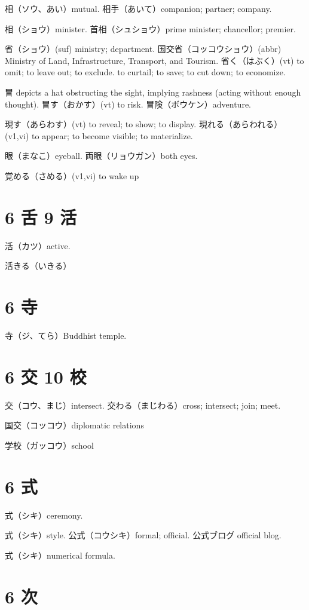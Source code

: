 相（ソウ、あい）mutual.
相手（あいて）companion; partner; company.

相（ショウ）minister.
首相（シュショウ）prime minister; chancellor; premier.

省（ショウ）(suf) ministry; department.
国交省（コッコウショウ）(abbr)
Ministry of Land, Infrastructure, Transport, and Tourism.
省く（はぶく）(vt)
to omit; to leave out; to exclude.
to curtail; to save; to cut down; to economize.

冒 depicts a hat obstructing the sight, implying rashness
(acting without enough thought).
冒す（おかす）(vt) to risk.
冒険（ボウケン）adventure.

現す（あらわす）(vt) to reveal; to show; to display.
現れる（あらわれる）(v1,vi) to appear; to become visible; to materialize.

眼（まなこ）eyeball.
両眼（リョウガン）both eyes.

覚める（さめる）(v1,vi) to wake up

\section{6 舌 9 活}

活（カツ）active.

活きる（いきる）

\section{6 寺}

寺（ジ、てら）Buddhist temple.

\section{6 交 10 校}

交（コウ、まじ）intersect.
交わる（まじわる）cross; intersect; join; meet.

国交（コッコウ）diplomatic relations

学校（ガッコウ）school

\section{6 式}

式（シキ）ceremony.

式（シキ）style.
公式（コウシキ）formal; official.
公式ブログ official blog.

式（シキ）numerical formula.

\section{6 次}

